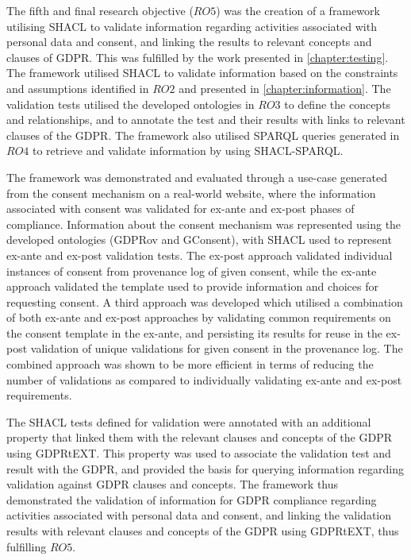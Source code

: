 The fifth and final research objective ($RO5$) was the creation of a framework utilising SHACL to validate information regarding activities associated with personal data and consent, and linking the results to relevant concepts and clauses of GDPR. This was fulfilled by the work presented in \autoref{chapter:testing}.
The framework utilised SHACL to validate information based on the constraints and assumptions identified in $RO2$ and presented in \autoref{chapter:information}.
The validation tests utilised the developed ontologies in $RO3$ to define the concepts and relationships, and to annotate the test and their results with links to relevant clauses of the GDPR.
The framework also utilised SPARQL queries generated in $RO4$ to retrieve and validate information by using SHACL-SPARQL.

The framework was demonstrated and evaluated through a use-case generated from the consent mechanism on a real-world website, where the information associated with consent was validated for ex-ante and ex-post phases of compliance.
Information about the consent mechanism was represented using the developed ontologies (GDPRov and GConsent), with SHACL used to represent ex-ante and ex-post validation tests.
The ex-post approach validated individual instances of consent from provenance log of given consent, while the ex-ante approach validated the template used to provide information and choices for requesting consent.
A third approach was developed which utilised a combination of both ex-ante and ex-post approaches by validating common requirements on the consent template in the ex-ante, and persisting its results for reuse in the ex-post validation of unique validations for given consent in the provenance log.
The combined approach was shown to be more efficient in terms of reducing the number of validations as compared to individually validating ex-ante and ex-post requirements.

The SHACL tests defined for validation were annotated with an additional property that linked them with the relevant clauses and concepts of the GDPR using GDPRtEXT. This property was used to associate the validation test and result with the GDPR, and provided the basis for querying information regarding validation against GDPR clauses and concepts. 
The framework thus demonstrated the validation of information for GDPR compliance regarding activities associated with personal data and consent, and linking the validation results with relevant clauses and concepts of the GDPR using GDPRtEXT, thus fulfilling $RO5$.

